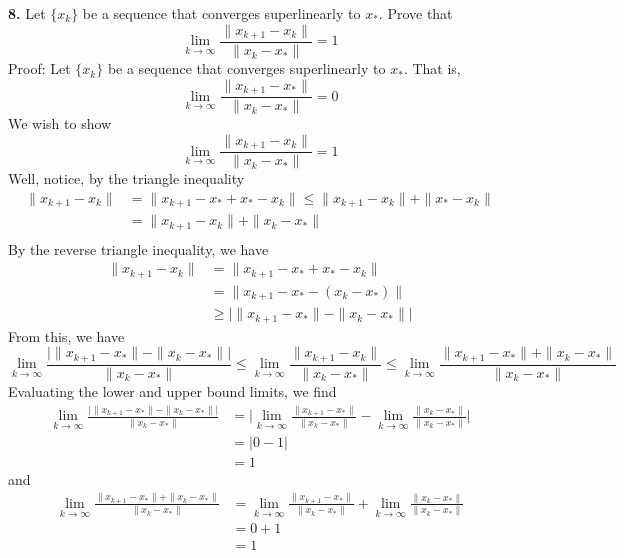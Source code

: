 \documentclass{article}
\begin{document}
\textbf{8.} Let $\{x_k\}$ be a sequence that converges superlinearly to $x_*$. Prove that
\[\lim_{k \to \infty} \frac{\|x_{k+1} - x_k\|}{\|x_k - x_*\|} = 1\]
\newline\newline\newline
Proof: Let $\{x_k\}$ be a sequence that converges superlinearly to $x_*$. That is,
\newline
\[\lim_{k \to \infty} \frac{\|x_{k+1} - x_*\|}{\|x_k - x_*\|} = 0\]
\newline
We wish to show
\newline
\[\lim_{k \to \infty} \frac{\|x_{k+1} - x_k\|}{\|x_k - x_*\|} = 1\]
\newline
Well, notice, by the triangle inequality
\begin{align*}
    \|x_{k+1} - x_k\| &= \|x_{k+1} - x_* + x_* - x_k\| \leq \|x_{k+1} - x_k\| + \|x_* - x_k\| \\
    &= \|x_{k+1} - x_k\| + \|x_k - x_*\| \\
\end{align*}
By the reverse triangle inequality, we have
\begin{align*}
    \|x_{k+1} - x_k\| &= \|x_{k+1} - x_* + x_* - x_k\| \\
    &= \|x_{k+1} - x_* - (x_k - x_*)\| \\
    &\geq \bigg|\|x_{k+1} - x_*\| - \|x_k - x_*\| \bigg|
\end{align*}
From this, we have
\[\lim_{k \to \infty} \frac{\bigg|\|x_{k+1} - x_*\| - \|x_k - x_*\|\bigg| }{\|x_k - x_*\|} \leq  \lim_{k \to \infty} \frac{\|x_{k+1} - x_k\|}{\|x_k - x_*\|} \leq \lim_{k \to \infty} \frac{\|x_{k+1} - x_*\| + \|x_k - x_*\|}{\|x_k - x_*\|}\]
\newline
Evaluating the lower and upper bound limits, we find
\begin{align*}
    \lim_{k \to \infty} \frac{\bigg| \|x_{k+1} - x_*\| - \|x_k - x_*\| \bigg| }{\|x_k - x_*\|} &= \bigg| \lim_{k \to \infty} \frac{\|x_{k+1} - x_*\|}{\|x_k - x_*\|} - \lim_{k \to \infty} \frac{\|x_k - x_*\|}{\|x_k - x_*\|} \bigg| \\
    &= \bigg| 0 - 1 \bigg| \\
    &= 1
\end{align*}
and
\begin{align*}
    \lim_{k \to \infty} \frac{\|x_{k+1} - x_*\| + \|x_k - x_*\|}{\|x_k - x_*\|} &= \lim_{k \to \infty} \frac{\|x_{k+1} - x_*\|}{\|x_k - x_*\|} + \lim_{k \to \infty} \frac{\|x_k - x_*\|}{\|x_k - x_*\|}\\
    &= 0 + 1\\
    &= 1
\end{align*}
\end{document}
